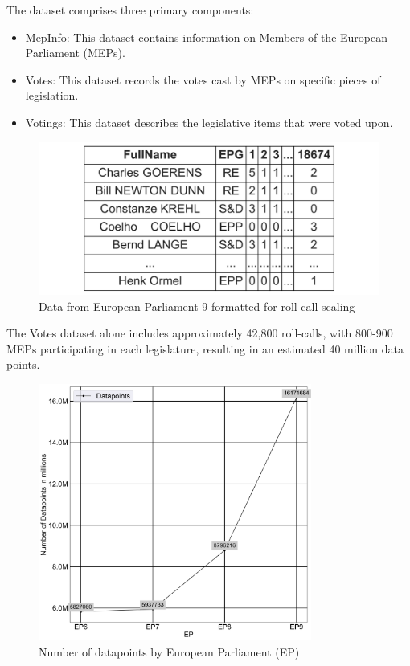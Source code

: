 \documentclass{report}
\begin{document}
    The dataset comprises three primary components:


    \begin{itemize}
        \item MepInfo: This dataset contains information on Members of the European Parliament (MEPs).
        \item Votes: This dataset records the votes cast by MEPs on specific pieces of legislation.
        \item Votings: This dataset describes the legislative items that were voted upon.
    \end{itemize}
    \begin{figure}[htb]
        \centering
        \includegraphics[width=1\textwidth]{Graphs/short_table9.png}
        \caption{Data from European Parliament 9 formatted for roll-call scaling}
        \label{fig:Structure table}
    \end{figure}

    The Votes dataset alone includes approximately 42,800 roll-calls, with 800-900 MEPs participating in each
    legislature, resulting in an estimated 40 million data points.
    \begin{figure}[htb]
        \centering
        \includegraphics[width=0.8\textwidth]{Graphs/Datapoints.png}
        \caption{Number of datapoints by European Parliament (EP)}
        \label{fig:Datapoint graph}
    \end{figure}
\end{document}
